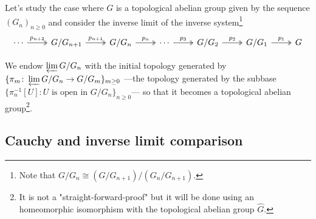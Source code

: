 Let's study the case where $G$ is a topological abelian group given by the sequence $(G_n)_{n\geq 0}$ and consider the inverse limit of the inverse system\footnote{Note that $G/G_n\cong (G/G_{n+1})/(G_n/G_{n+1})$.}
\[
\begin{tikzcd}
       \cdots \ar[r, "p_{n+2}", twoheadrightarrow] &G/G_{n+1} \ar[r, "p_{n+1}", twoheadrightarrow] & G/G_n \ar[r, "p_{n}", twoheadrightarrow] & \cdots \ar[r, "p_{3}", twoheadrightarrow] & G/G_2 \ar[r, "p_{2}", twoheadrightarrow] & G/G_1 \ar[r, "p_1", twoheadrightarrow] & G
    \end{tikzcd}
\]

We endow $\varprojlim G/G_n$ with the initial topology generated by $\{\pi_m\colon \varprojlim G/G_n\to G/G_m\}_{m\geq 0}$ ---the topology generated by the subbase $\{\pi_n^{-1}[U] : U\text{ is open in }G/G_n \}_{n\geq 0}$--- so that it becomes a topological abelian group\footnote{It is not a "straight-forward-proof" but it will be done using an homeomorphic isomorphism with the topological abelian group $\hat G$.}. 

\subsection{Cauchy and inverse limit comparison}

